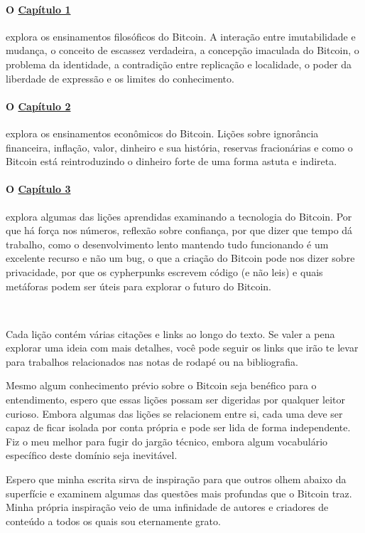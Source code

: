 \paragraph{O \hyperref[ch:philosophy]{Capítulo 1}}{explora os ensinamentos filosóficos do Bitcoin. A interação entre imutabilidade e mudança, o conceito de escassez verdadeira, a concepção imaculada do Bitcoin, o problema da identidade, a contradição entre replicação e localidade, o poder da liberdade de expressão e os limites do conhecimento. }

\paragraph{O \hyperref[ch:economics]{Capítulo 2}}{explora os ensinamentos econômicos do Bitcoin. Lições sobre ignorância financeira, inflação, valor, dinheiro e sua história, reservas fracionárias e como o Bitcoin está reintroduzindo o dinheiro forte de uma forma astuta e indireta.}

\paragraph{O \hyperref[ch:technology]{Capítulo 3}}{explora algumas das lições aprendidas examinando a tecnologia do Bitcoin. Por que há força nos números, reflexão sobre confiança, por que dizer que tempo dá trabalho, como o desenvolvimento lento mantendo tudo funcionando é um excelente recurso e não um bug, o que a criação do Bitcoin pode nos dizer sobre privacidade, por que os cypherpunks escrevem código (e não leis) e quais metáforas podem ser úteis para explorar o futuro do Bitcoin.}

~

Cada lição contém várias citações e links ao longo do texto. Se valer a pena explorar uma ideia com mais detalhes, você pode seguir os links que irão te levar para trabalhos relacionados nas notas de rodapé ou na bibliografia.

Mesmo algum conhecimento prévio sobre o Bitcoin seja benéfico para o entendimento, espero que essas lições possam ser digeridas por qualquer leitor curioso. Embora algumas das lições se relacionem entre si, cada uma deve ser capaz de ficar isolada por conta própria e pode ser lida de forma independente. Fiz o meu melhor para fugir do jargão técnico, embora algum vocabulário específico deste domínio seja inevitável.

Espero que minha escrita sirva de inspiração para que outros olhem abaixo da superfície e examinem algumas das questões mais profundas que o Bitcoin traz. Minha própria inspiração veio de uma infinidade de autores e criadores de conteúdo a todos os quais sou eternamente grato.

